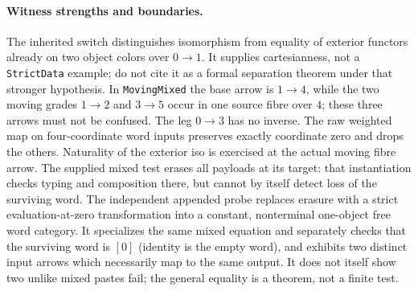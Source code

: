 \documentclass{article}
\begin{document}
\paragraph{Witness strengths and boundaries.}
The inherited switch distinguishes isomorphism from equality of exterior functors already on two object colors over $0\to1$. It supplies cartesianness, not a \texttt{StrictData} example; do not cite it as a formal separation theorem under that stronger hypothesis. In \texttt{MovingMixed} the base arrow is $1\to4$, while the two moving grades $1\to2$ and $3\to5$ occur in one source fibre over $4$; these three arrows must not be confused. The leg $0\to3$ has no inverse. The raw weighted map on four-coordinate word inputs preserves exactly coordinate zero and drops the others. Naturality of the exterior iso is exercised at the actual moving fibre arrow. The supplied mixed test erases all payloads at its target: that instantiation checks typing and composition there, but cannot by itself detect loss of the surviving word. The independent appended probe replaces erasure with a strict evaluation-at-zero transformation into a constant, nonterminal one-object free word category. It specializes the same mixed equation and separately checks that the surviving word is $[0]$ (identity is the empty word), and exhibits two distinct input arrows which necessarily map to the same output. It does not itself show two unlike mixed pastes fail; the general equality is a theorem, not a finite test.
\end{document}
